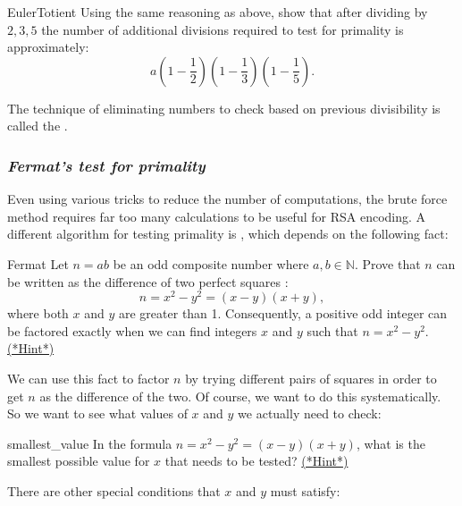 \begin{exercise}{EulerTotient}
Using the same reasoning as above, show that after dividing by $2,3,5$ the number of additional divisions required to test for primality is approximately:
$$a\left(1 - \frac{1}{2}\right) \left(1 - \frac{1}{3}\right)\left( 1 - \frac{1}{5} \right).$$
\end{exercise}

The technique of eliminating numbers to check based on previous divisibility is called the .


\subsubsection*{\emph{Fermat's test for primality}}
Even using various tricks to reduce the number of computations, the brute force method requires far too many calculations to be useful for RSA encoding. A different algorithm for testing primality is , which depends on the following fact:

\begin{exercise}{Fermat}
Let $n= ab$ be an odd composite number where $a,b \in \mathbb{N}$. Prove that $n$ can be written
as the difference of two perfect squares :
$$
n = x^2 - y^2 = (x-y)(x+y),
$$
where both $x$ and $y$ are greater than 1. Consequently, a positive odd integer can be factored exactly when we
can find integers $x$ and $y$ such that $n = x^2 - y^2$.
\hyperref[sec:crypt:hints]{(*Hint*)} 
\end{exercise} 
We can use this fact to factor $n$ by trying different pairs of squares in order to get $n$ as the difference of the two.  Of course, we want to do this systematically. So we want to see what values of $x$ and $y$ we actually need to check:

\begin{exercise}{smallest_value}
In the formula  $n = x^2 - y^2 = (x-y)(x+y)$,  what is the smallest possible value for $x$ that needs to be tested?
\hyperref[sec:crypt:hints]{(*Hint*)}
\end{exercise}

There are other special conditions that $x$ and $y$ must satisfy:

